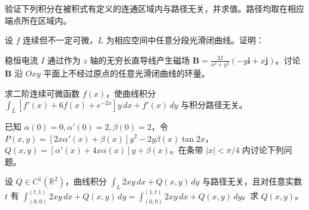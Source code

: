 \newpage
\noindent\begin{minipage}{\textwidth}
验证下列积分在被积式有定义的连通区域内与路径无关，并求值。路径均取在相应端点所在区域内。
\end{minipage}\par\vfill
\newpage
\noindent\begin{minipage}{\textwidth}
设 $f$ 连续但不一定可微，$L$ 为相应空间中任意分段光滑闭曲线。证明：
\end{minipage}\par\vfill
\noindent\begin{minipage}{\textwidth}
稳恒电流 $I$ 通过作为 $z$ 轴的无穷长直导线产生磁场 $\boldsymbol B=\frac{2I}{x^2+y^2}(-y\boldsymbol i+x\boldsymbol j)$。讨论 $\boldsymbol B$ 沿 $Oxy$ 平面上不经过原点的任意光滑闭曲线的环量。
\end{minipage}\par\vfill
\noindent\begin{minipage}{\textwidth}
求二阶连续可微函数 $f(x)$，使曲线积分 $\displaystyle\int_L[f'(x)+6f(x)+e^{-2x}]y\,dx+f'(x)\,dy$ 与积分路径无关。
\end{minipage}\par\vfill
\noindent\begin{minipage}{\textwidth}
已知 $\alpha(0)=0,\alpha'(0)=2,\beta(0)=2$，令 $P(x,y)=[2x\alpha'(x)+\beta(x)]y^2-2y\beta(x)\tan2x$，$Q(x,y)=[\alpha'(x)+4x\alpha(x)]y+\beta(x)$。在条带 $|x|<\pi/4$ 内讨论下列问题。
\end{minipage}\par\vfill
\newpage
\noindent\begin{minipage}{\textwidth}
设 $Q\in C^1(\mathbb R^2)$，曲线积分 $\int_L2xy\,dx+Q(x,y)\,dy$ 与路径无关，且对任意实数 $t$ 有 $\displaystyle\int_{(0,0)}^{(t,1)}2xy\,dx+Q(x,y)\,dy=\int_{(0,0)}^{(1,t)}2xy\,dx+Q(x,y)\,dy$。求 $Q(x,y)$。
\end{minipage}\par\vfill
